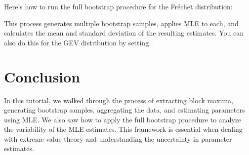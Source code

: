 \documentclass[a4paper,11pt,openany,english]{sphinxmanual}
\begin{document}
\sphinxAtStartPar
Here’s how to run the full bootstrap procedure for the Fréchet distribution:

\begin{sphinxVerbatim}[commandchars=\\\{\}]
   

  

     


 \PYG{p}{[}\PYG{p}{]}
 \PYG{p}{[}\PYG{p}{]}
\end{sphinxVerbatim}

\sphinxAtStartPar
This process generates multiple bootstrap samples, applies MLE to each, and calculates the mean and standard deviation of the resulting estimates. You can also do this for the GEV distribution by setting .


\section{Conclusion}
\label{\detokenize{bootstrap:conclusion}}
\sphinxAtStartPar
In this tutorial, we walked through the process of extracting block maxima, generating bootstrap samples, aggregating the data, and estimating parameters using MLE. We also saw how to apply the full bootstrap procedure to analyze the variability of the MLE estimates. This framework is essential when dealing with extreme value theory and understanding the uncertainty in parameter estimates.
\end{document}
